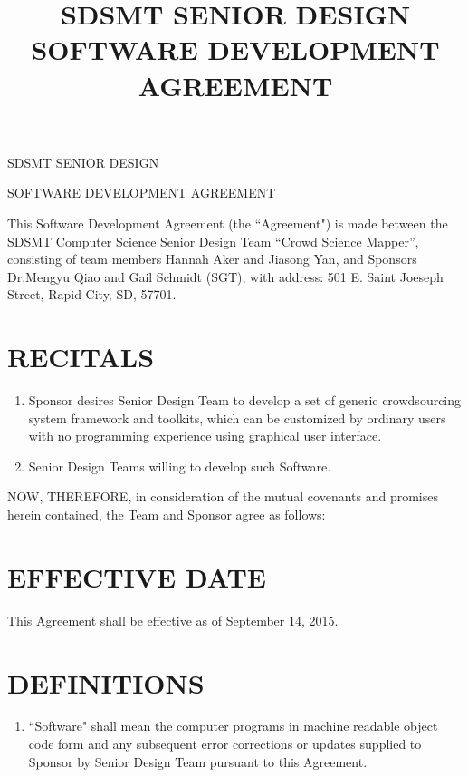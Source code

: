 \documentclass[11pt]{article}
\title{SDSMT SENIOR DESIGN SOFTWARE DEVELOPMENT AGREEMENT}
\begin{document}


{\Large \bf 
\centerline{SDSMT SENIOR DESIGN}\centerline{SOFTWARE DEVELOPMENT AGREEMENT}
}
\vspace{\baselineskip}

This Software Development Agreement (the ``Agreement") is made between the SDSMT  Computer Science Senior Design Team ``Crowd Science Mapper'',
consisting of team members Hannah Aker and Jiasong Yan, 
 and  Sponsors  Dr.Mengyu Qiao and Gail Schmidt (SGT), 
 with address: 501 E. Saint Joeseph Street, Rapid City, SD, 57701. 

\section{RECITALS}
\begin{enumerate}  \itemsep4pt \parskip0pt 
\item Sponsor desires Senior Design Team to develop a set of generic crowdsourcing system framework and toolkits, which can be customized by ordinary users with no programming experience using graphical user interface.    

\item Senior Design Teams willing to develop such Software.  
\end{enumerate}
NOW, THEREFORE, in consideration of the mutual covenants and promises herein contained, the Team and Sponsor agree as follows:  

\section{EFFECTIVE DATE }

This Agreement shall be effective as of September 14, 2015.  

\section{DEFINITIONS }
\begin{enumerate}  \itemsep4pt \parskip0pt 
\item ``Software" shall mean the computer programs in machine readable object code form and any subsequent error corrections or updates supplied to Sponsor by Senior Design Team pursuant to this Agreement.

\end{enumerate}
\end{document}
